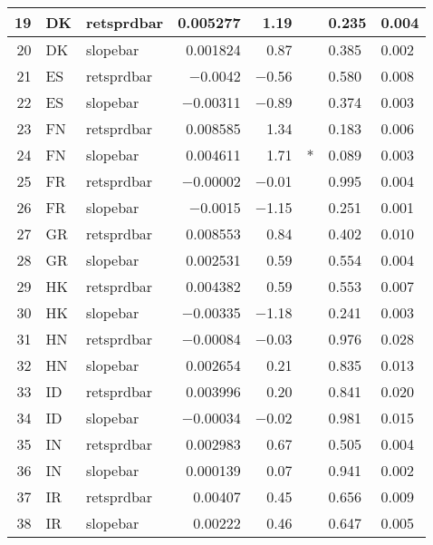 \begin{longtable}{|r|l|l|r|r|l|l|l|}
   19 &    DK &    retsprdbar &    0.005277 &    1.19 &      &    0.235 &    0.004\\\hline
   20 &    DK &    slopebar &    0.001824 &    0.87 &      &    0.385 &    0.002\\\hline
   21 &    ES &    retsprdbar &    $-$0.0042 &    $-$0.56 &      &    0.580 &    0.008\\\hline
   22 &    ES &    slopebar &    $-$0.00311 &    $-$0.89 &      &    0.374 &    0.003\\\hline
   23 &    FN &    retsprdbar &    0.008585 &    1.34 &      &    0.183 &    0.006\\\hline
   24 &    FN &    slopebar &    0.004611 &    1.71 &    * &    0.089 &    0.003\\\hline
   25 &    FR &    retsprdbar &    $-$0.00002 &    $-$0.01 &      &    0.995 &    0.004\\\hline
   26 &    FR &    slopebar &    $-$0.0015 &    $-$1.15 &      &    0.251 &    0.001\\\hline
   27 &    GR &    retsprdbar &    0.008553 &    0.84 &      &    0.402 &    0.010\\\hline
   28 &    GR &    slopebar &    0.002531 &    0.59 &      &    0.554 &    0.004\\\hline
   29 &    HK &    retsprdbar &    0.004382 &    0.59 &      &    0.553 &    0.007\\\hline
   30 &    HK &    slopebar &    $-$0.00335 &    $-$1.18 &      &    0.241 &    0.003\\\hline
   31 &    HN &    retsprdbar &    $-$0.00084 &    $-$0.03 &      &    0.976 &    0.028\\\hline
   32 &    HN &    slopebar &    0.002654 &    0.21 &      &    0.835 &    0.013\\\hline
   33 &    ID &    retsprdbar &    0.003996 &    0.20 &      &    0.841 &    0.020\\\hline
   34 &    ID &    slopebar &    $-$0.00034 &    $-$0.02 &      &    0.981 &    0.015\\\hline
   35 &    IN &    retsprdbar &    0.002983 &    0.67 &      &    0.505 &    0.004\\\hline
   36 &    IN &    slopebar &    0.000139 &    0.07 &      &    0.941 &    0.002\\\hline
   37 &    IR &    retsprdbar &    0.00407 &    0.45 &      &    0.656 &    0.009\\\hline
   38 &    IR &    slopebar &    0.00222 &    0.46 &      &    0.647 &    0.005\\\hline

\end{longtable}
